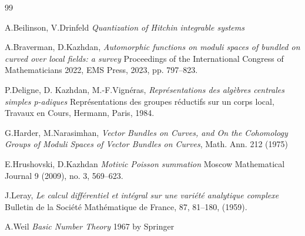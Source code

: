 \documentclass[11pt,a4paper,twoside]{amsart}
\theoremstyle{definition}
\begin{document}
\begin{thebibliography}{99} 

 A.Beilinson, V.Drinfeld {\em Quantization of Hitchin integrable systems}





 A.Braverman, D.Kazhdan, {\em Automorphic functions on moduli spaces of bundled on curved over local fields: a survey}
Proceedings of the International Congress of Mathematicians 2022, EMS Press, 2023, pp. 797–823.

 P.Deligne, D. Kazhdan, M.-F.Vignéras, {\em
Représentations des algèbres centrales simples p-adiques} Représentations des groupes réductifs sur un corps local,
Travaux en Cours, Hermann, Paris, 1984.  

     G.Harder,  M.Narasimhan, {\em Vector Bundles on Curves, and On the Cohomology Groups of Moduli Spaces of Vector Bundles on Curves}, Math. Ann. 212 (1975)

   E.Hrushovski, D.Kazhdan {\em Motivic Poisson summation} Moscow Mathematical Journal 9 (2009), no. 3, 569–623. 

  J.Leray,  {\em Le calcul différentiel et intégral sur une variété analytique complexe}  Bulletin de la Société Mathématique de France, 87, 81–180,  (1959).

A.Weil {\em Basic Number Theory} 1967 by Springer 





\end{thebibliography}
\end{document}
